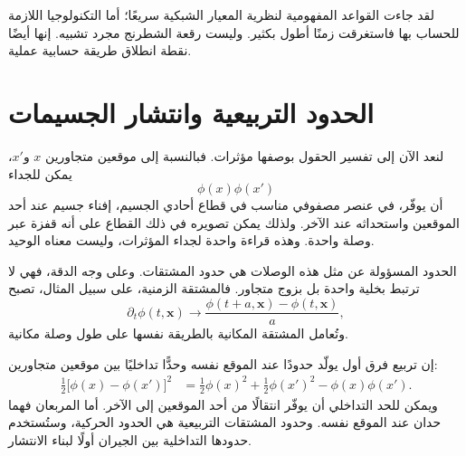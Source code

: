 لقد جاءت القواعد المفهومية لنظرية المعيار الشبكية سريعًا؛ أما التكنولوجيا اللازمة للحساب بها فاستغرقت زمنًا أطول بكثير. وليست رقعة الشطرنج مجرد تشبيه. إنها أيضًا نقطة انطلاق طريقة حسابية عملية.

\section{الحدود التربيعية وانتشار الجسيمات}

لنعد الآن إلى تفسير الحقول بوصفها مؤثرات. فبالنسبة إلى موقعين متجاورين \(x\) و\(x'\)، يمكن للجداء
\begin{equation}
\phi(x)\phi(x')
\end{equation}
أن يوفّر، في عنصر مصفوفي مناسب في قطاع أحادي الجسيم، إفناء جسيم عند أحد الموقعين واستحداثه عند الآخر. ولذلك يمكن تصويره في ذلك القطاع على أنه قفزة عبر وصلة واحدة. وهذه قراءة واحدة لجداء المؤثرات، وليست معناه الوحيد.

الحدود المسؤولة عن مثل هذه الوصلات هي حدود المشتقات. وعلى وجه الدقة، فهي لا ترتبط بخلية واحدة بل بزوج متجاور. فالمشتقة الزمنية، على سبيل المثال، تصبح
\begin{equation}
\partial_t\phi(t,\mathbf{x})
\longrightarrow
\frac{\phi(t+a,\mathbf{x})-\phi(t,\mathbf{x})}{a},
\end{equation}
وتُعامل المشتقة المكانية بالطريقة نفسها على طول وصلة مكانية.

\begin{classroomqa}
\end{classroomqa}

إن تربيع فرق أول يولّد حدودًا عند الموقع نفسه وحدًّا تداخليًا بين موقعين متجاورين:
\begin{align}
\frac{1}{2}\bigl[\phi(x)-\phi(x')\bigr]^2
&=
\frac{1}{2}\phi(x)^2
+\frac{1}{2}\phi(x')^2
-\phi(x)\phi(x').
\end{align}
ويمكن للحد التداخلي أن يوفّر انتقالًا من أحد الموقعين إلى الآخر. أما المربعان فهما حدان عند الموقع نفسه. وحدود المشتقات التربيعية هي الحدود الحركية، وستُستخدم حدودها التداخلية بين الجيران أولًا لبناء الانتشار.


